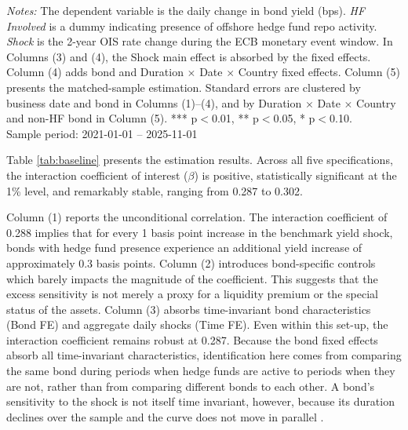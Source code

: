 \documentclass[english, 11pt, oneside]{article}
\begin{document}
\begin{table}[t]
\vspace{1ex}
\raggedright\scriptsize
\textit{Notes:} The dependent variable is the daily change in bond yield (bps). \textit{HF Involved} is a dummy indicating presence of offshore hedge fund repo activity. \textit{Shock} is the 2-year OIS rate change during the ECB monetary event window. In Columns (3) and (4), the Shock main effect is absorbed by the fixed effects. Column (4) adds bond and Duration $\times$ Date $\times$ Country fixed effects. Column (5) presents the matched-sample estimation. Standard errors are clustered by business date and bond in Columns (1)–(4), and by Duration $\times$ Date $\times$ Country and non-HF bond in Column (5). *** p$<$0.01, ** p$<$0.05, * p$<$0.10. \\ Sample period: 2021-01-01 -- 2025-11-01
\end{table}

Table \ref{tab:baseline} presents the estimation results. Across all five specifications, the interaction coefficient of interest ($\beta$) is positive, statistically significant at the 1\% level, and remarkably stable, ranging from 0.287 to 0.302.

Column (1) reports the unconditional correlation. The interaction coefficient of 0.288 implies that for every 1 basis point increase in the benchmark yield shock, bonds with hedge fund presence experience an additional yield increase of approximately 0.3 basis points. Column (2) introduces bond-specific controls which barely impacts the magnitude of the coefficient. This suggests that the excess sensitivity is not merely a proxy for a liquidity premium or the special status of the assets. Column (3) absorbs time-invariant bond characteristics (Bond FE) and aggregate daily shocks (Time FE). Even within this set-up, the interaction coefficient remains robust at 0.287. Because the bond fixed effects absorb all time-invariant characteristics, identification here comes from comparing the same bond during periods when hedge funds are active to periods when they are not, rather than from comparing different bonds to each other. A bond's sensitivity to the shock is not itself time invariant, however, because its duration declines over the sample and the curve does not move in parallel \citep{nyborg2025}.
\end{document}
